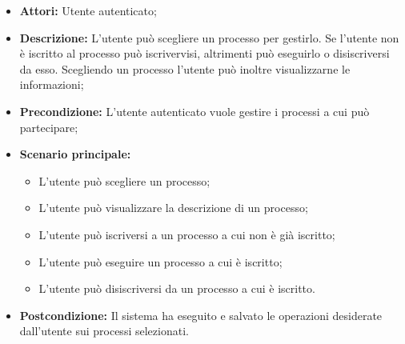 \begin{itemize}
\item \textbf{Attori:} Utente autenticato;
\item \textbf{Descrizione:} L'utente può scegliere un processo per gestirlo.
Se l'utente non è iscritto al processo può iscrivervisi, altrimenti può eseguirlo o disiscriversi da esso.
Scegliendo un processo l'utente può inoltre visualizzarne le informazioni;
\item \textbf{Precondizione:} L'utente autenticato vuole gestire i processi a cui può partecipare;
\item \textbf{Scenario principale:}
\begin{itemize}
\item L'utente può scegliere un processo;
\item L'utente può visualizzare la descrizione di un processo;
\item L'utente può iscriversi a un processo a cui non è già iscritto;
\item L'utente può eseguire un processo a cui è iscritto;
\item L'utente può disiscriversi da un processo a cui è iscritto.
\end{itemize}
\item \textbf{Postcondizione:} Il sistema ha eseguito e salvato le operazioni desiderate dall'utente sui processi selezionati.
\end{itemize}

\hypertarget{L2.1}{}
